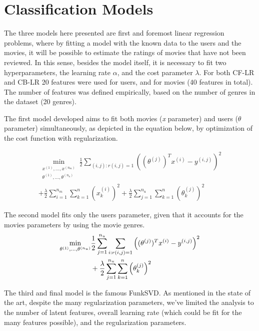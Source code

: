 \documentclass[conference]{IEEEtran}
\begin{document}
\section{Classification Models}

The three models here presented are first and foremost linear regression problems, where by fitting a model with the known data to the users and the movies, it will be possible to estimate the ratings of movies that have not been reviewed. In this sense, besides the model itself, it is necessary to fit two hyperparameters, the learning rate $\alpha$, and the cost parameter $\lambda$. For both CF-LR and CB-LR 20 features were used for users, and for movies (40 features in total). The number of features was defined empirically, based on the number of genres in the dataset (20 genres).

The first model developed aims to fit both movies (\textit{x} parameter) and users ($\theta$ parameter) simultaneously, as depicted in the equation below, by optimization of the cost function with regularization.

\begin{multline}
\min_{\substack{x^{(1)}, \dots, x^{(n_m)} \\ \theta^{(1)}, \dots, \theta^{(n_u)}}} 
\frac{1}{2} \sum_{(i, j) : r(i, j) = 1} \left( (\theta^{(j)})^T x^{(i)} - y^{(i,j)} \right)^2 \\
+ \frac{\lambda}{2} \sum_{i=1}^{n_m} \sum_{k=1}^{n} \left( x_k^{(i)} \right)^2 + \frac{\lambda}{2} \sum_{j=1}^{n_u} \sum_{k=1}^{n} \left( \theta_k^{(j)} \right)^2
\end{multline}



The second model fits only the users parameter, given that it accounts for the movies parameters by using the movie genres.
\begin{align}
\min_{\theta^{(1)}, \dots, \theta^{(n_u)}} 
&\frac{1}{2} \sum_{j=1}^{n_u} \sum_{i : r(i, j) = 1} \left( (\theta^{(j)})^T x^{(i)} - y^{(i,j)} \right)^2 \notag \\
&+ \frac{\lambda}{2} \sum_{j=1}^{n_u} \sum_{k=1}^{n} \left( \theta_k^{(j)} \right)^2
\end{align}

The third and final model is the famous FunkSVD. As mentioned in the state of the art, despite the many regularization parameters, we've limited the analysis to the number of latent features, overall learning rate (which could be fit for the many features possible), and the regularization parameters.
\end{document}
